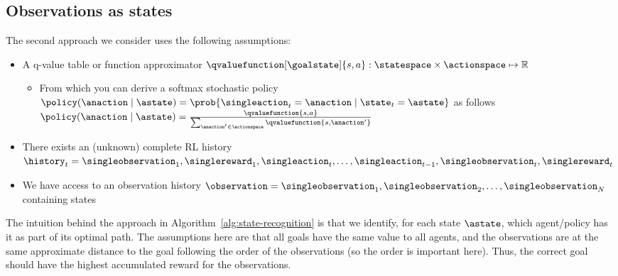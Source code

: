\subsection{Observations as states}
\label{subsec:stateGR}

The second approach we consider uses the following assumptions:

\begin{itemize}
    \item A q-value table or function approximator $\qvaluefunction[\goalstate]{s,a}: \statespace \times \actionspace \mapsto \mathbb{R}$
    \begin{itemize}
        \item From which you can derive a softmax stochastic policy $\policy(\anaction \mid \astate) = \prob{\singleaction_{t} = \anaction \mid \state_{t} = \astate}$ as follows $\policy(\anaction \mid \astate) = \frac{\qvaluefunction{s,a}}{\sum_{\anaction' \in \actionspace}\qvaluefunction{s,\anaction'}}$
    \end{itemize}
    \item There exists an (unknown) complete RL history $\history_{t} = \singleobservation_{1}, \singlereward_{1}, \singleaction_{t}, \dots, \singleaction_{t-1}, \singleobservation_{t},\singlereward_{t}$
    \item We have access to an observation history $\observation = \singleobservation_{1}, \singleobservation_{2}, \dots, \singleobservation_{N}$ containing states
\end{itemize}

The intuition behind the approach in Algorithm~\ref{alg:state-recognition} is that we identify, for each state $\astate$, which agent/policy has it as part of its optimal path. 
The assumptions here are that all goals have the same value to all agents, and the observations are at the same approximate distance to the goal following the order of the observations (so the order is important here). 
Thus, the correct goal should have the highest accumulated reward for the observations. 

